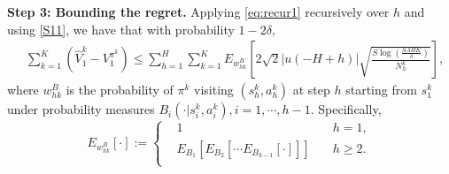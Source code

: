 \documentclass[11pt]{article}
\newcommand{\1}{\mathbbm{1}}
\begin{document}
\noindent\textbf{Step 3: Bounding the regret.} 
Applying \eqref{eq:recur1} recursively over $h$ and using \eqref{S11}, we have that with probability $1- 2 \delta,$
\begin{align}\label{eq:step3}
&\sum_{k=1}^K \left(\hat{V}_1^k-V_1^{\pi^k} \right)\leq \sum_{h=1}^H \sum_{k=1}^K E_{w_{hk}^{B}}\left [2\sqrt{2} \vert u(-H+h)\vert\sqrt{\frac{S\log\left (\frac{SAHK}{\delta}\right )}{N_h^k}} \right ],
\end{align}
where $w_{hk}^B$ is the probability of $\pi^k$ visiting $(s_h^k,a_h^k)$ at step $h$ starting from $s_1^k$ under probability measures $B_i(\cdot\vert s_i^k,a_i^k),i=1,\cdots,h-1$. Specifically,
\begin{equation*}
E_{w_{hk}^{B}}[\cdot] :=\left\{
	\begin{aligned}
	&1 \quad &h=1, \\
	&E_{B_1}\left [E_{B_2}\left [\cdots E_{B_{h-1}}\left [\cdot\right ]\right ]\right ] \quad &h\geq 2. \\
	\end{aligned}
	\right
	.
\end{equation*}
\end{document}
